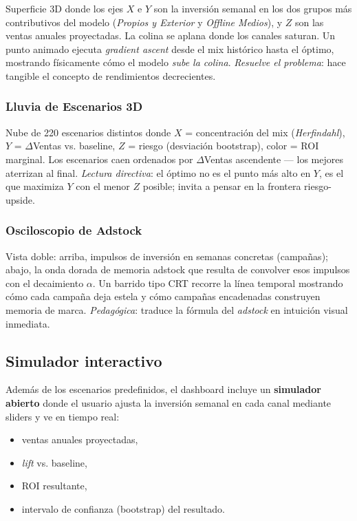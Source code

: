 Superficie 3D donde los ejes $X$ e $Y$ son la inversión semanal en los dos grupos más contributivos del modelo (\textit{Propios y Exterior} y \textit{Offline Medios}), y $Z$ son las ventas anuales proyectadas. La colina se aplana donde los canales saturan. Un punto animado ejecuta \textit{gradient ascent} desde el mix histórico hasta el óptimo, mostrando físicamente cómo el modelo \textit{sube la colina}. \textit{Resuelve el problema}: hace tangible el concepto de rendimientos decrecientes.

\subsubsection{Lluvia de Escenarios 3D}

Nube de 220 escenarios distintos donde $X$ = concentración del mix (\textit{Herfindahl}), $Y$ = $\Delta$Ventas vs. baseline, $Z$ = riesgo (desviación bootstrap), color = ROI marginal. Los escenarios caen ordenados por $\Delta$Ventas ascendente — los mejores aterrizan al final. \textit{Lectura directiva}: el óptimo no es el punto más alto en $Y$, es el que maximiza $Y$ con el menor $Z$ posible; invita a pensar en la frontera riesgo-upside.

\subsubsection{Osciloscopio de Adstock}

Vista doble: arriba, impulsos de inversión en semanas concretas (campañas); abajo, la onda dorada de memoria adstock que resulta de convolver esos impulsos con el decaimiento $\alpha$. Un barrido tipo CRT recorre la línea temporal mostrando cómo cada campaña deja estela y cómo campañas encadenadas construyen memoria de marca. \textit{Pedagógica}: traduce la fórmula del \textit{adstock} en intuición visual inmediata.

\subsection{Simulador interactivo}

Además de los escenarios predefinidos, el dashboard incluye un \textbf{simulador abierto} donde el usuario ajusta la inversión semanal en cada canal mediante sliders y ve en tiempo real:

\begin{itemize}[leftmargin=*, itemsep=1pt]
    \item ventas anuales proyectadas,
    \item \textit{lift} vs. baseline,
    \item ROI resultante,
    \item intervalo de confianza (bootstrap) del resultado.
\end{itemize}

